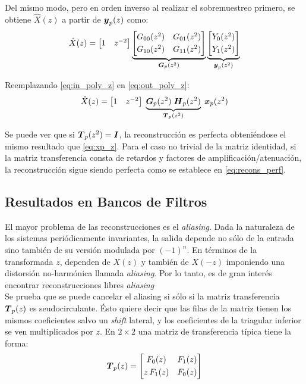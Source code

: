 		Del mismo modo, pero en orden inverso al realizar el sobremuestreo primero, se obtiene $\hat{X}(z)$ a partir de $\boldsymbol{y}_p(z)$ como:
		\begin{equation}
		\hat{X}(z) = \begin{bmatrix} 1 & z^{-2} \end{bmatrix} \underbrace{\begin{bmatrix} G_{00}(z^2) & G_{01}(z^2) \\[0.3em] G_{10}(z^2) & G_{11}(z^2) \end{bmatrix}}_{\boldsymbol{G}_p(z^2)} \underbrace{\begin{bmatrix} Y_0(z^2)\\[0.3em] Y_1(z^2) \end{bmatrix}}_{\boldsymbol{y}_p(z^2)} 
			\label{eq:out_poly_z}
		\end{equation}

		Reemplazando \eqref{eq:in_poly_z} en \eqref{eq:out_poly_z}:
		\begin{equation*}
		\hat{X}(z) = \begin{bmatrix} 1 & z^{-2} \end{bmatrix}\; \underbrace{\boldsymbol{G}_p(z^2) \; \boldsymbol{H}_p(z^2)}_{\boldsymbol{T}_p(z^2)} \; \boldsymbol{x}_p(z^2)
		\end{equation*}

		Se puede ver que si $\boldsymbol{T}_p(z^2) = \boldsymbol{I}$, la reconstrucción es perfecta obteniéndose el mismo resultado que \eqref{eq:xp_z}. Para el caso no trivial de la matriz identidad, si la matriz transferencia consta de retardos y factores de amplificación/atenuación, la reconstrucción sigue siendo perfecta como se establece en \eqref{eq:recons_perf}.

	\subsection{Resultados en Bancos de Filtros}
	El mayor problema de las reconstrucciones es el \emph{aliasing}. Dada la naturaleza de los sistemas periódicamente invariantes, la salida depende no sólo de la entrada sino también de su versión modulada por $(-1)^n$. En términos de la transformada $z$, dependen de $X(z)$ y también de $X(-z)$ imponiendo una distorsión no-harmónica llamada \emph{aliasing}. Por lo tanto, es de gran interés encontrar reconstrucciones libres \emph{aliasing}\\

		Se prueba que se puede cancelar el aliasing si sólo si la matriz transferencia $\boldsymbol{T}_p(z)$ es seudocirculante. Ésto quiere decir que las filas de la matriz tienen los mismos coeficientes salvo un \emph{shift} lateral, y los coeficientes de la triagular inferior se ven multiplicados por $z$. En $2\times 2$ una matriz de transferencia típica tiene la forma:
		\begin{equation*}
		\boldsymbol{T}_p(z) = \begin{bmatrix} F_0 (z) & F_1(z) \\[0.3em] z\, F_1(z) & F_0(z) \end{bmatrix}
		\end{equation*}
			
